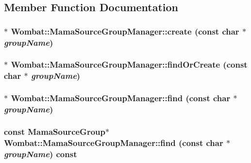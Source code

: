 \subsection{Member Function Documentation}
\hypertarget{classWombat_1_1MamaSourceGroupManager_af20e29d1eb75c20be4ef85ad57400b09}{
\subsubsection[{create}]{$\ast$ Wombat::MamaSourceGroupManager::create (const char $\ast$ {\em groupName})}}
\label{classWombat_1_1MamaSourceGroupManager_af20e29d1eb75c20be4ef85ad57400b09}
\hypertarget{classWombat_1_1MamaSourceGroupManager_a418343b7d566032b737f3e88c5c4b848}{
\subsubsection[{findOrCreate}]{$\ast$ Wombat::MamaSourceGroupManager::findOrCreate (const char $\ast$ {\em groupName})}}
\label{classWombat_1_1MamaSourceGroupManager_a418343b7d566032b737f3e88c5c4b848}
\hypertarget{classWombat_1_1MamaSourceGroupManager_a1fa1f259b6a9f4cc9ca29276f524f78b}{
\subsubsection[{find}]{$\ast$ Wombat::MamaSourceGroupManager::find (const char $\ast$ {\em groupName})}}
\label{classWombat_1_1MamaSourceGroupManager_a1fa1f259b6a9f4cc9ca29276f524f78b}
\hypertarget{classWombat_1_1MamaSourceGroupManager_a15d98b9adefe68162725d073cc8cb354}{
\subsubsection[{find}]{\setlength{\rightskip}{0pt plus 5cm}const {\bf MamaSourceGroup}$\ast$ Wombat::MamaSourceGroupManager::find (const char $\ast$ {\em groupName}) const}}
